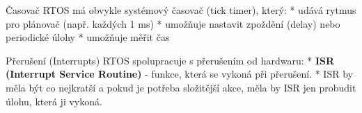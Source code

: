 \sec Časovač
RTOS má obvykle systémový časovač (tick timer), který:
\begitems
* udává rytmus pro plánovač (např. každých 1 ms)
* umožňuje nastavit zpoždění (delay) nebo periodické úlohy
* umožňuje měřit čas
\enditems


\sec Přerušení (Interrupts)
RTOS spolupracuje s přerušením od hardwaru:
\begitems
* {\bf ISR (Interrupt Service Routine)} - funkce, která se vykoná při přerušení.
* ISR by měla být co nejkratší a pokud je potřeba složitější akce, měla by ISR jen probudit úlohu, která ji vykoná.
\enditems


